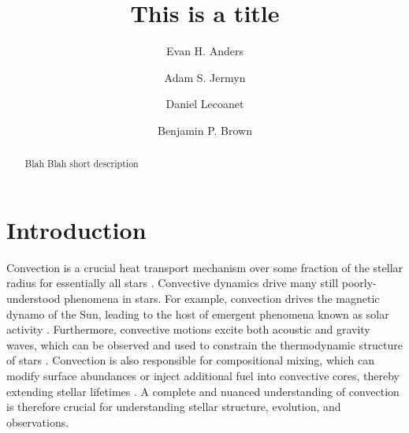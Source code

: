 \documentclass{aastex631}
\begin{document}
\title{This is a title}
\author[0000-0002-3433-4733]{Evan H. Anders}
\author[0000-0001-5048-9973]{Adam S. Jermyn}
\author[0000-0002-7635-9728]{Daniel Lecoanet}
\author[0000-0001-8935-219X]{Benjamin P. Brown}


\begin{abstract}
Blah Blah short description
\end{abstract}



\section{Introduction}
\label{sec:introduction}
Convection is a crucial heat transport mechanism over some fraction of the stellar radius for essentially all stars \citep{woosley_etal_2002, hansen_etal_2004, christensen-dalsgaard_2021}.
Convective dynamics drive many still poorly-understood phenomena in stars.
For example, convection drives the magnetic dynamo of the Sun, leading to the host of emergent phenomena known as solar activity \citep{brun_browning_2017}.
Furthermore, convective motions excite both acoustic and gravity waves, which can be observed and used to constrain the thermodynamic structure of stars \citep{aerts2010, basu2016}.
Convection is also responsible for compositional mixing, which can modify surface abundances or inject additional fuel into convective cores, thereby extending stellar lifetimes \citep{salaris_cassisi_2017}.
A complete and nuanced understanding of convection is therefore crucial for understanding stellar structure, evolution, and observations.
\end{document}
